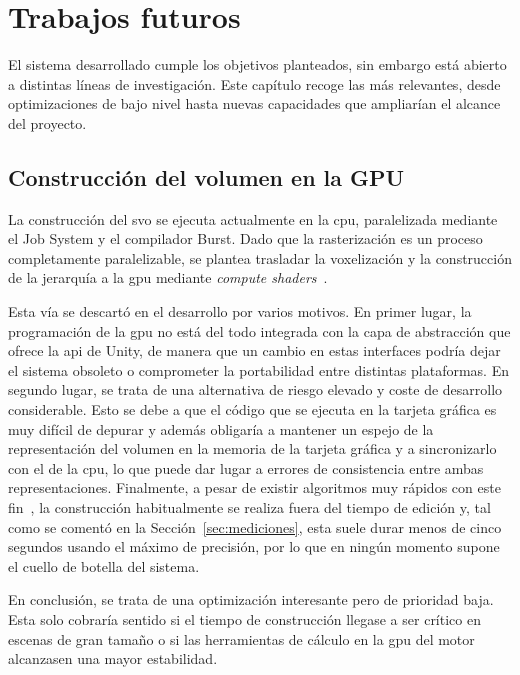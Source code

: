 \chapter{Trabajos futuros}
\label{chap:trabajos-futuros}

El sistema desarrollado cumple los objetivos planteados, sin embargo está abierto a distintas líneas de investigación.
Este capítulo recoge las más relevantes, desde optimizaciones de bajo nivel hasta nuevas capacidades que ampliarían el alcance del proyecto.

\section{Construcción del volumen en la GPU}

La construcción del \acrshort{svo} se ejecuta actualmente en la \acrshort{cpu}, paralelizada mediante el Job System y el compilador Burst.
Dado que la rasterización es un proceso completamente paralelizable, se plantea trasladar la voxelización y la construcción de la jerarquía a la \acrshort{gpu} mediante \textit{compute shaders}~\cite{UnityComputeShaders}.

Esta vía se descartó en el desarrollo por varios motivos.
En primer lugar, la programación de la \acrshort{gpu} no está del todo integrada con la capa de abstracción que ofrece la \acrshort{api} de Unity, de manera que un cambio en estas interfaces podría dejar el sistema obsoleto o comprometer la portabilidad entre distintas plataformas.
En segundo lugar, se trata de una alternativa de riesgo elevado y coste de desarrollo considerable.
Esto se debe a que el código que se ejecuta en la tarjeta gráfica es muy difícil de depurar y además obligaría a mantener un espejo de la representación del volumen en la memoria de la tarjeta gráfica y a sincronizarlo con el de la \acrshort{cpu}, lo que puede dar lugar a errores de consistencia entre ambas representaciones.
Finalmente, a pesar de existir algoritmos muy rápidos con este fin~\cite{schwarz2010fast}, la construcción habitualmente se realiza fuera del tiempo de edición y, tal como se comentó en la Sección~\ref{sec:mediciones}, esta suele durar menos de cinco segundos usando el máximo de precisión, por lo que en ningún momento supone el cuello de botella del sistema.

En conclusión, se trata de una optimización interesante pero de prioridad baja.
Esta solo cobraría sentido si el tiempo de construcción llegase a ser crítico en escenas de gran tamaño o si las herramientas de cálculo en la \acrshort{gpu} del motor alcanzasen una mayor estabilidad.

